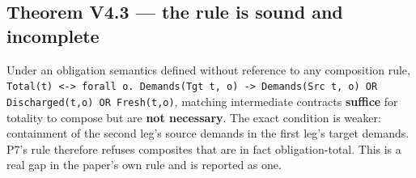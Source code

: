\subsection{Theorem V4.3 --- the rule is sound and incomplete}

Under an obligation semantics defined without reference to any composition rule,
\texttt{Total(t) <-> forall o. Demands(Tgt t, o) -> Demands(Src t, o) OR Discharged(t,o)
OR Fresh(t,o)}, matching intermediate contracts \textbf{suffice} for totality to
compose but are \textbf{not necessary}. The exact condition is weaker: containment of
the second leg's source demands in the first leg's target demands. P7's rule
therefore refuses composites that are in fact obligation-total. This is a real
gap in the paper's own rule and is reported as one.
